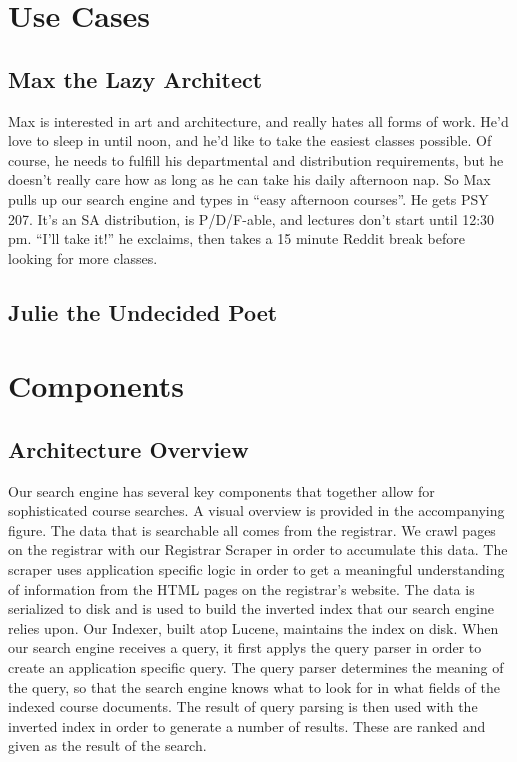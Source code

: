 \documentclass[12pt,letterpaper]{article}
\begin{document}
\section{Use Cases}
\subsection{Max the Lazy Architect}
Max is interested in art and architecture, and really hates all forms of work. He'd love to sleep in until noon, and he'd like to take the easiest classes possible. Of course, he needs to fulfill his departmental and distribution requirements, but he doesn't really care how as long as he can take his daily afternoon nap. So Max pulls up our search engine and types in ``easy afternoon courses''. He gets PSY 207. It's an SA distribution, is P/D/F-able, and lectures don't start until 12:30 pm. ``I'll take it!'' he exclaims, then takes a 15 minute Reddit break before looking for more classes.
		
\subsection{Julie the Undecided Poet}

\section{Components}

\subsection{Architecture Overview}
Our search engine has several key components that together allow for sophisticated course searches. A visual overview is provided in the accompanying figure. The data that is searchable all comes from the registrar. We crawl pages on the registrar with our Registrar Scraper in order to accumulate this data. The scraper uses application specific logic in order to get a meaningful understanding of information from the HTML pages on the registrar's website. The data is serialized to disk and is used to build the inverted index that our search engine relies upon. Our Indexer, built atop Lucene, maintains the index on disk. When our search engine receives a query, it first applys the query parser in order to create an application specific query. The query parser determines the meaning of the query, so that the search engine knows what to look for in what fields of the indexed course documents. The result of query parsing is then used with the inverted index in order to generate a number of results. These are ranked and given as the result of the search.
\end{document}
